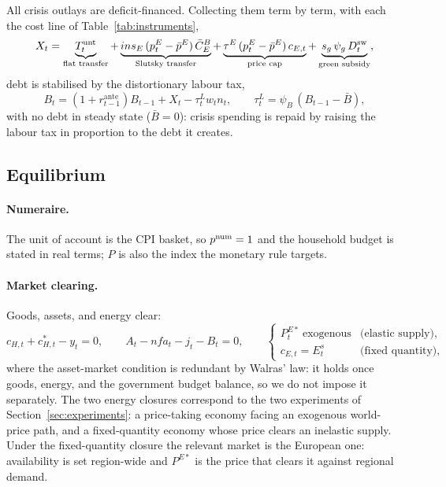 All crisis outlays are deficit-financed. Collecting them term by term, with each the
cost line of Table~\ref{tab:instruments},
%
\begin{equation}
X_t=\underbrace{T^{\mathrm{unt}}_t}_{\text{flat transfer}}
+\underbrace{ins_E\,(p^{E}_t-\bar p^E)\,\bar C^{B}_E}_{\text{Slutsky transfer}}
+\underbrace{\tau^E\,(p^{E}_t-\bar p^E)\,c_{E,t}}_{\text{price cap}}
+\underbrace{s_g\,\psi_g\,D^{\mathrm{sw}}_t}_{\text{green subsidy}},
\label{eq:outlays}
\end{equation}
%
debt is stabilised by the distortionary labour tax,
%
\begin{equation}
B_t=(1+r^{\mathrm{ante}}_{t-1})B_{t-1}+X_t-\tau^L_t w_t n_t,
\qquad
\tau^L_t=\psi_B\,(B_{t-1}-\bar B),
\label{eq:gbc2}
\end{equation}
%
with no debt in steady state ($\bar B=0$): crisis spending is repaid by raising the
labour tax in proportion to the debt it creates.

\subsection{Equilibrium}\label{sec:eqm}

\paragraph{Numeraire.} The unit of account is the CPI basket, so $p^{\mathrm{num}}=1$ and the
household budget is stated in real terms; $P$ is also the index the monetary rule targets.

\paragraph{Market clearing.}
Goods, assets, and energy clear:
%
\begin{equation}
c_{H,t}+c^{*}_{H,t}-y_t=0,
\qquad
A_t-nfa_t-j_t-B_t=0,
\qquad
\begin{cases}
P^{E*}_t\ \text{exogenous} & \text{(elastic supply)},\\
c_{E,t}=E^{s}_t & \text{(fixed quantity)},
\end{cases}
\label{eq:clearing}
\end{equation}
%
where the asset-market condition is redundant by Walras' law: it holds once goods,
energy, and the government budget balance, so we do not impose it separately. The two
energy closures correspond to the two experiments of Section~\ref{sec:experiments}: a
price-taking economy facing an exogenous world-price path, and a fixed-quantity
economy whose price clears an inelastic supply. Under the fixed-quantity closure the
relevant market is the European one: availability is set region-wide and $P^{E*}$ is
the price that clears it against regional demand.

